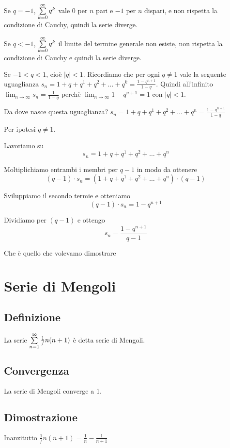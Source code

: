 Se $q=-1$, $\sum\limits_{k=0}^{\infty}q^k$ vale $0$ per $n$ pari e $-1$ per $n$ dispari, e non rispetta la condizione di Cauchy, quindi la serie diverge.

Se $q<-1$, $\sum\limits_{k=0}^{\infty}q^k$ il limite del termine generale non esiste, non rispetta la condizione di Cauchy e quindi la serie diverge.

Se  $-1< q <1$, cioè $|q|<1$. Ricordiamo che per ogni $q \neq 1$ vale la seguente uguaglianza $s_{n} = 1+q+q^1+q^2+\ldots+q^k = \frac{1-q^{n+1}}{1-q}$. Quindi all'infinito $\lim_{n\to\infty} s_n = \frac{1}{1-q}$ perchè $\lim_{n\to\infty}1-q^{n+1}=1$ con $|q|<1$. 

\begin{tip}
Da dove nasce questa uguaglianza? $s_{n} = 1+q+q^1+q^2+\ldots+q^n = \frac{1-q^{n+1}}{1-q}$

Per ipotesi $q \neq 1$.

Lavoriamo su  $$s_{n} = 1+q+q^1+q^2+\ldots+q^n$$

Moltiplichiamo entrambi i membri per $q-1$ in modo da ottenere
$$(q-1) \cdot s_{n} = (1+q+q^1+q^2+\ldots+q^n)\cdot (q-1)$$

Sviluppiamo il secondo termie e otteniamo
$$(q-1) \cdot s_{n} = 1-q^{n+1}$$

Dividiamo per $(q-1)$ e ottengo
$$s_{n} = \frac{1-q^{n+1}}{q-1}$$

Che è quello che volevamo dimostrare

\end{tip}

\section{Serie di Mengoli}

\subsection{Definizione}
La serie $\sum\limits_{n=1}^{\infty}\frac{1}/{n(n+1)}$ è detta serie di Mengoli.

\subsection{Convergenza}
La serie di Mengoli converge a 1.

\subsection{Dimostrazione}
Inanzitutto $\frac{1}/{n(n+1)} = \frac{1}{n} - \frac{1}{n+1}$

